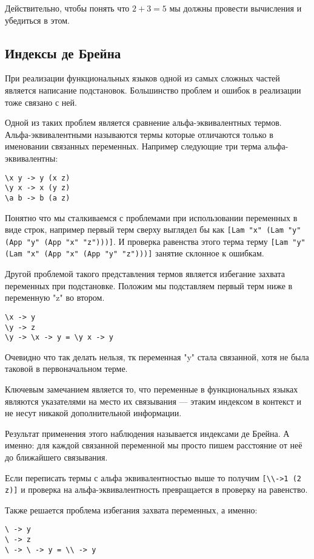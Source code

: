 Действительно, чтобы понять что $2 + 3 = 5$ мы должны провести вычисления и убедиться в этом.

\subsection{Индексы де Брейна}\label{de_brujin}
При реализации функциональных языков одной из самых сложных частей является написание подстановок. Большинство проблем и ошибок в реализации тоже связано с ней.

Одной из таких проблем является сравнение альфа-эквивалентных термов. Альфа-эквивалентными называются термы которые отличаются только в именовании связанных переменных. Например следующие три терма альфа-эквивалентны:

\begin{lstlisting}
\x y -> y (x z)
\y x -> x (y z)
\a b -> b (a z)
\end{lstlisting}

Понятно что мы сталкиваемся с проблемами при использовании переменных в виде строк, например первый терм сверху выглядел бы как \lstinline{[Lam "x" (Lam "y" (App "y" (App "x" "z")))]}. И проверка равенства этого терма терму \lstinline{[Lam "y" (Lam "x" (App "x" (App "y" "z")))]} занятие склонное к ошибкам.

Другой проблемой такого представления термов является избегание захвата переменных при подстановке. Положим мы подставляем первый терм ниже в переменную "z" во втором.
\begin{lstlisting}
\x -> y
\y -> z
\y -> \x -> y = \y x -> y
\end{lstlisting}

Очевидно что так делать нельзя, тк переменная "y" стала связанной, хотя не была таковой в первоначальном терме.

Ключевым замечанием является то, что переменные в функциональных языках являются указателями на место их связывания --- этаким индексом в контекст и не несут никакой дополнительной информации.

Результат применения этого наблюдения называется индексами де Брейна. А именно: для каждой связанной переменной мы просто пишем расстояние от неё до ближайшего связывания.

Если переписать термы с альфа эквивалентностью выше то получим \lstinline{[\\->1 (2 z)]} и проверка на альфа-эквивалентность превращается в проверку на равенство.

Также решается проблема избегания захвата переменных, а именно:
\begin{lstlisting}
\ -> y
\ -> z
\ -> \ -> y = \\ -> y
\end{lstlisting}

